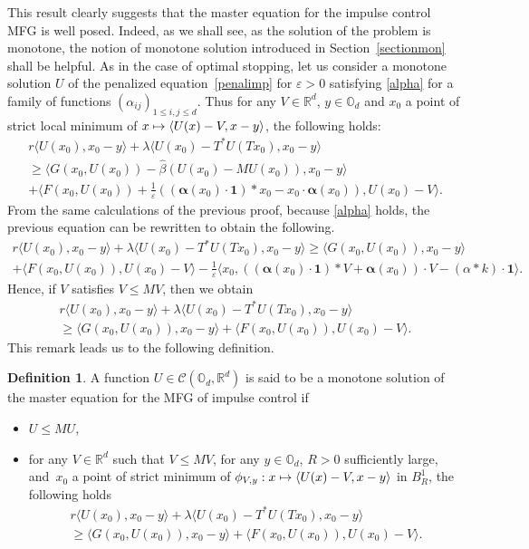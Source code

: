 \documentclass[JEP,XML,SOM,Unicode,NoEqCountersInSection,published]{cedram}
\let\mathcal\mathscr
\newcommand\mto{\mathchoice{\longmapsto}{\mapsto}{\mapsto}{\mapsto}}
\newcommand{\One}{\mathbf{1}}
\let\epsilon\varepsilon
\theoremstyle{definition}
\newtheorem{Def}{Definition}[section]
\begin{document}
This result clearly suggests that the master equation for the impulse control MFG is well posed. Indeed, as we shall see, as the solution of the problem is monotone, the notion of monotone solution introduced in Section~\ref{sectionmon} shall be helpful. As in the case of optimal stopping, let us consider a monotone solution $U$ of the penalized equation~\eqref{penalimp} for $\epsilon > 0$ satisfying \eqref{alpha} for a family of functions $(\alpha_{ij})_{1\leq i,j\leq d}$. Thus for any $V \in \mathbb{R}^d$, $y \in \mathbb{O}_d$ and $x_0$ a point of strict local minimum of $ x \mto \langle U(x)-V, x-y\rangle$, the following holds:\vspace*{-5pt}
\begin{multline*}
r\langle U(x_0), x_0-y\rangle + \lambda \langle U(x_0)-T^*U(Tx_0),x_0-y\rangle\\
\geq \langle G(x_0,U(x_0))-\hat{\beta}(U(x_0)-MU(x_0)), x_0-y \rangle\\
+ \langle F(x_0,U(x_0))+\frac{1}{\epsilon} ((\boldsymbol{\alpha}(x_0)\cdot\One)* x_0-x_0\cdot \boldsymbol{\alpha}(x_0)), U(x_0)-V\rangle.
\end{multline*}
From the same calculations of the previous proof, because \eqref{alpha} holds, the previous equation can be rewritten to obtain the following.\vspace*{-5pt}
\begin{multline*}
r\langle U(x_0), x_0-y\rangle+\lambda \langle U(x_0)-T^*U(Tx_0),x_0-y\rangle\geq \langle G(x_0,U(x_0)), x_0-y \rangle\\
+ \langle F(x_0,U(x_0)), U(x_0)-V\rangle-\frac{1}{\epsilon}\langle x_0, ((\boldsymbol{\alpha}(x_0)\cdot\One)* V+\boldsymbol{\alpha}(x_0))\cdot V-(\alpha*k)\cdot \One\rangle.
\end{multline*}
Hence, if $V$ satisfies $V \leq MV$, then we obtain\vspace*{-5pt}
\begin{multline*}
r\langle U(x_0), x_0-y\rangle + \lambda \langle U(x_0)-T^*U(Tx_0),x_0-y\rangle \\
\geq
\langle G(x_0,U(x_0)), x_0-y \rangle+\langle F(x_0,U(x_0)), U(x_0)-V\rangle.
\end{multline*}
This remark leads us to the following definition.
\begin{Def}\label{defmonimp}
A function $U \in \mathcal{C}(\mathbb{O}_d, \mathbb{R}^d)$ is said to be a monotone solution of the master equation for the MFG of impulse control if
\begin{itemize}
\item $U \leq MU$,
\item for any $V \in \mathbb{R}^d$ such that $V \leq MV$, for any $y \in \mathbb{O}_d$, $R>0$ sufficiently large, and~$x_0$ a point of strict minimum of $\phi_{V,y}: x \mto \langle U(x)-V, x-y\rangle$ in $B^1_R$, the following holds\vspace*{-5pt}
\begin{multline*}
r\langle U(x_0), x_0-y\rangle + \lambda \langle U(x_0)-T^*U(Tx_0),x_0-y\rangle \\
\geq
\langle G(x_0,U(x_0)), x_0-y \rangle+\langle F(x_0,U(x_0)), U(x_0)-V\rangle.
\end{multline*}
\end{itemize}
\end{Def}
\end{document}

